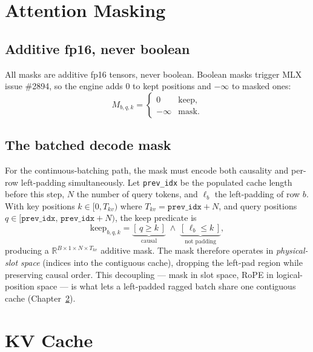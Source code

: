 \documentclass[11pt,a4paper]{report}
\newcommand{\R}{\mathbb{R}}
\newcommand{\code}[1]{\texttt{#1}}
\begin{document}
\chapter{Attention Masking}
\label{ch:mask}

\section{Additive fp16, never boolean}
All masks are additive fp16 tensors, never boolean. Boolean masks trigger MLX issue
\#2894, so the engine adds $0$ to kept positions and $-\infty$ to masked ones:
\begin{equation}
  M_{b,q,k} =
  \begin{cases} 0 & \text{keep},\\ -\infty & \text{mask}. \end{cases}
\end{equation}

\section{The batched decode mask}
For the continuous-batching path, the mask must encode both causality and per-row
left-padding simultaneously. Let \code{prev\_idx} be the populated cache length
before this step, $N$ the number of query tokens, and $\ell_b$ the left-padding of
row $b$. With key positions $k \in [0, T_{kv})$ where $T_{kv}=\code{prev\_idx}+N$,
and query positions $q \in [\code{prev\_idx},\, \code{prev\_idx}+N)$, the keep
predicate is
\begin{equation}
  \text{keep}_{b,q,k} = \underbrace{[\,q \ge k\,]}_{\text{causal}} \;\wedge\; \underbrace{[\,\ell_b \le k\,]}_{\text{not padding}},
\end{equation}
producing a $\R^{B\times 1\times N\times T_{kv}}$ additive mask. The mask therefore
operates in \emph{physical-slot space} (indices into the contiguous cache),
dropping the left-pad region while preserving causal order. This decoupling --- mask
in slot space, RoPE in logical-position space --- is what lets a left-padded ragged
batch share one contiguous cache (Chapter~\ref{ch:cache}).

\chapter{KV Cache}
\label{ch:cache}
\end{document}
